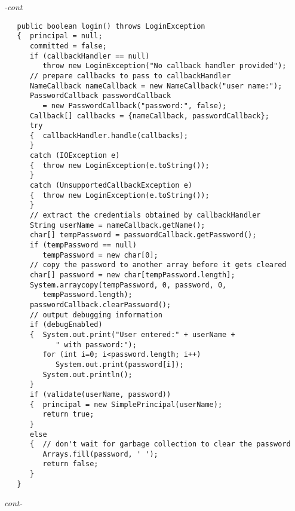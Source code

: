 \begin{figure*}\begin{program}\emph{-cont}\begin{verbatim}
   public boolean login() throws LoginException
   {  principal = null;
      committed = false;
      if (callbackHandler == null)
         throw new LoginException("No callback handler provided");
      // prepare callbacks to pass to callbackHandler
      NameCallback nameCallback = new NameCallback("user name:");
      PasswordCallback passwordCallback
         = new PasswordCallback("password:", false);
      Callback[] callbacks = {nameCallback, passwordCallback};
      try
      {  callbackHandler.handle(callbacks);
      }
      catch (IOException e)
      {  throw new LoginException(e.toString());
      }
      catch (UnsupportedCallbackException e)
      {  throw new LoginException(e.toString());
      }
      // extract the credentials obtained by callbackHandler
      String userName = nameCallback.getName();
      char[] tempPassword = passwordCallback.getPassword();
      if (tempPassword == null)
         tempPassword = new char[0];
      // copy the password to another array before it gets cleared
      char[] password = new char[tempPassword.length];
      System.arraycopy(tempPassword, 0, password, 0,
         tempPassword.length);
      passwordCallback.clearPassword();
      // output debugging information
      if (debugEnabled)
      {  System.out.print("User entered:" + userName +
            " with password:");
         for (int i=0; i<password.length; i++)
            System.out.print(password[i]);
         System.out.println();
      }
      if (validate(userName, password))
      {  principal = new SimplePrincipal(userName);
         return true;
      }
      else
      {  // don't wait for garbage collection to clear the password
         Arrays.fill(password, ' ');
         return false;
      }
   }
\end{verbatim}\hfill \emph{cont-}\end{program}\end{figure*}%
